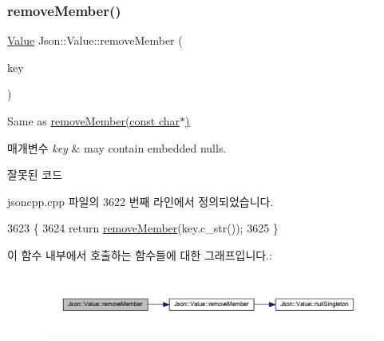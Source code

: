 \subsubsection{\texorpdfstring{remove\+Member()}{removeMember()}\hspace{0.1cm}{\footnotesize\ttfamily [2/5]}}
{\footnotesize\ttfamily \hyperlink{class_json_1_1_value}{Value} Json\+::\+Value\+::remove\+Member (\begin{DoxyParamCaption}\item[{const \hyperlink{json_8h_a1e723f95759de062585bc4a8fd3fa4be}{J\+S\+O\+N\+C\+P\+P\+\_\+\+S\+T\+R\+I\+NG} \&}]{key }\end{DoxyParamCaption})}

Same as \hyperlink{class_json_1_1_value_aa52f7873b95d29627d6e83ba96f69aaa}{remove\+Member(const char$\ast$)} 
\begin{DoxyParams}{매개변수}
{\em key} & may contain embedded nulls. \\
\hline
\end{DoxyParams}
\begin{DoxyRefDesc}{잘못된 코드}
\item[\hyperlink{deprecated__deprecated000002}{잘못된 코드}]\end{DoxyRefDesc}


jsoncpp.\+cpp 파일의 3622 번째 라인에서 정의되었습니다.


\begin{DoxyCode}
3623 \{
3624   \textcolor{keywordflow}{return} \hyperlink{class_json_1_1_value_aa52f7873b95d29627d6e83ba96f69aaa}{removeMember}(key.c\_str());
3625 \}
\end{DoxyCode}
이 함수 내부에서 호출하는 함수들에 대한 그래프입니다.\+:\nopagebreak
\begin{figure}[H]
\begin{center}
\leavevmode
\includegraphics[width=350pt]{class_json_1_1_value_a1dfd5d30fbc53fcd9c4955b8b3e7885c_cgraph}
\end{center}
\end{figure}
\mbox{\label{class_json_1_1_value_a708e599489adf30d65bf85a8ee16e6fb}} 
